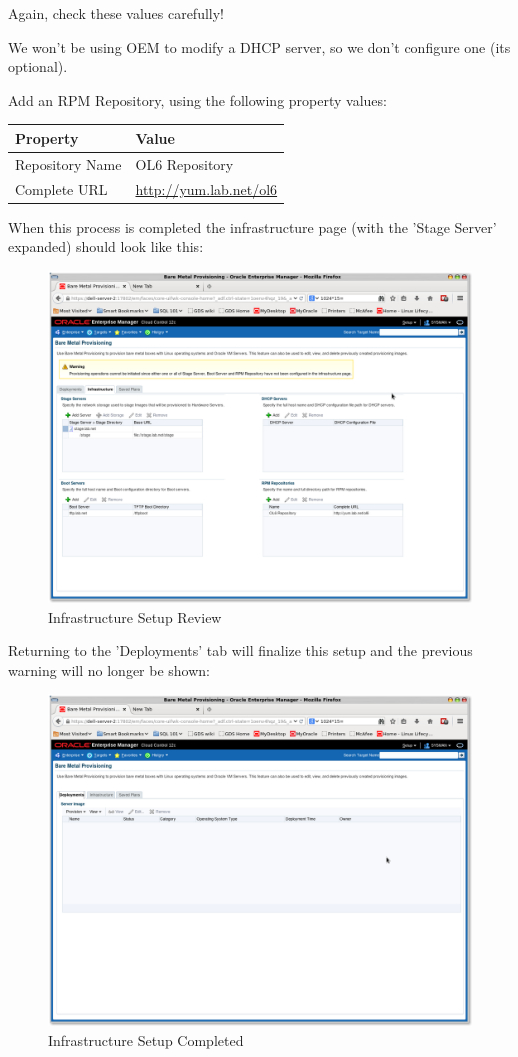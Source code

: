 \documentclass[11pt]{article}
\begin{document}
Again, check these values carefully!

We won't be using OEM to modify a DHCP server, so we don't configure one (its optional).

Add an RPM Repository, using the following property values:

\begin{center}
\begin{tabular}{ll}
Property & Value\\
\hline
Repository Name & OL6 Repository\\
Complete URL & \url{http://yum.lab.net/ol6}\\
\end{tabular}
\end{center}

When this process is completed the infrastructure page (with the 'Stage Server' expanded) should look like this:
\begin{figure}[htb]
\centering
\includegraphics[width=.9\linewidth]{./images/Infra_review.png}
\caption{Infrastructure Setup Review}
\end{figure}
\clearpage

Returning to the 'Deployments' tab will finalize this setup and the previous warning will no longer be shown:
\begin{figure}[htb]
\centering
\includegraphics[width=.9\linewidth]{./images/Infra_Complete.png}
\caption{Infrastructure Setup Completed}
\end{figure}
\clearpage
\end{document}
